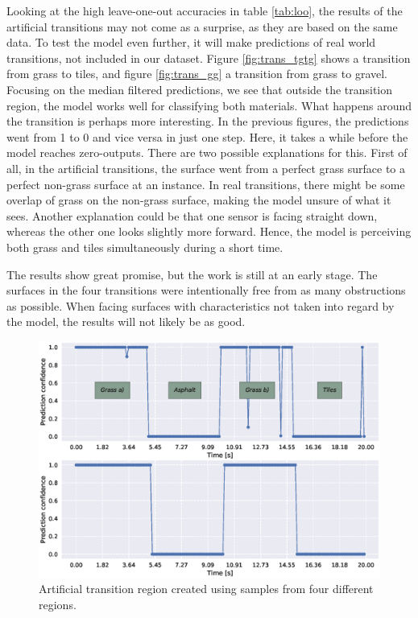 Looking at the high leave-one-out accuracies in table \ref{tab:loo}, the results of the artificial transitions may not come as a surprise, as they are based on the same data. To test the model even further, it will make predictions of real world transitions, not included in our dataset. Figure \ref{fig:trans_tgtg} shows a transition from grass to tiles, and figure \ref{fig:trans_gg} a transition from grass to gravel. Focusing on the median filtered predictions, we see that outside the transition region, the model works well for classifying both materials. What happens around the transition is perhaps more interesting. In the previous figures, the predictions went from 1 to 0 and vice versa in just one step. Here, it takes a while before the model reaches zero-outputs. There are two possible explanations for this. First of all, in the artificial transitions, the surface went from a perfect grass surface to a perfect non-grass surface at an instance. In real transitions, there might be some overlap of grass on the non-grass surface, making the model unsure of what it sees. Another explanation could be that one sensor is facing straight down, whereas the other one looks slightly more forward. Hence, the model is perceiving both grass and tiles simultaneously during a short time. 

The results show great promise, but the work is still at an early stage. The surfaces in the four transitions were intentionally free from as many obstructions as possible. When facing surfaces with characteristics not taken into regard by the model, the results will not likely be as good. 

\begin{figure}
	\centering
	\includegraphics[scale=0.5]{figs_temp/varmats1}
	\caption{Artificial transition region created using samples from four different regions.}
	\label{fig:artificial1}
\end{figure}

